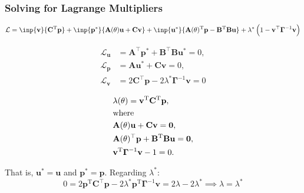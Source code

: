 \documentclass[
  pdf,
  10pt,
  xcolor={svgnames},
]{beamer}
\newcommand{\mbf}[1]{\mathbf{#1}}
\newcommand{\mc}[1]{\mathcal{#1}}
\newcommand{\T}{\mathrm{T}}
\newcommand{\mat}[1]{\mathbf{{#1}}}
\begin{document}
\begin{frame}
  \frametitle{Solving for Lagrange Multipliers}
  \begin{block}{}
    \begin{equation*}
      \mc{L}
      = \inp{\mbf{v}}{\mat{C}^\T \mbf{p}}
      + \inp{\mbf{p}^*}{\mat{A}(\theta)\mbf{u} + \mat{C} \mbf{v}}
      + \inp{\mbf{u}^*}{
        \mat{A}(\theta)^\T \mbf{p} - \mat{B}^\T \mat{B} \mbf{u}
      }
      + \lambda^* \left( 1-\mbf{v}^\top \mat{\Gamma}^{-1} \mbf{v} \right)
    \end{equation*}
  \end{block}
  \begin{minipage}{.5\linewidth}
    \begin{align*}
      \mc{L}_\mbf{u}
       & = \mat{A}^\top \mbf{p}^* + \mat{B}^\top\mat{B} \mbf{u}^* = 0,      \\
      \mc{L}_\mbf{p}
       & = \mat{A} \mbf{u}^* + \mat{C} \mbf{v} = 0,                         \\
      \mc{L}_\mbf{v}
       & = 2\mat{C}^\top \mbf{p} - 2\lambda^* \mat{\Gamma}^{-1} \mbf{v} = 0
    \end{align*}
  \end{minipage}%
  \begin{minipage}{.5\linewidth}
    \begin{align*}
       &
      \lambda(\theta)
      = \mbf{v}^\T \mat{C}^\T \mbf{p},        \\
       & \text{where}\notag                   \\
       &
      \mat{A}(\theta)\mbf{u}
      + \mat{C} \mbf{v} = \mbf{0},            \\
       &
      \mat{A}({\theta})^\top \mbf{p}
      + \mat{B}^\T \mat{B} \mbf{u} = \mbf{0}, \\
       &
      \mbf{v}^\T \mat{\Gamma}^{-1}\mbf{v}
      - 1 = 0.
    \end{align*}
  \end{minipage}
  That is, $\mbf{u}^* = \mbf{u}$ and $\mbf{p}^* = \mbf{p}$. \pause Regarding
  $\lambda^*$:
  \[
    0 =
    2\mbf{p}^\T \mat{C}^\top \mbf{p}
    - 2\lambda^* \mbf{p}^\T \mat{\Gamma}^{-1} \mbf{v}
    = 2 \lambda - 2 \lambda^*
    \implies \lambda = \lambda^*
  \]
\end{frame}
\end{document}
